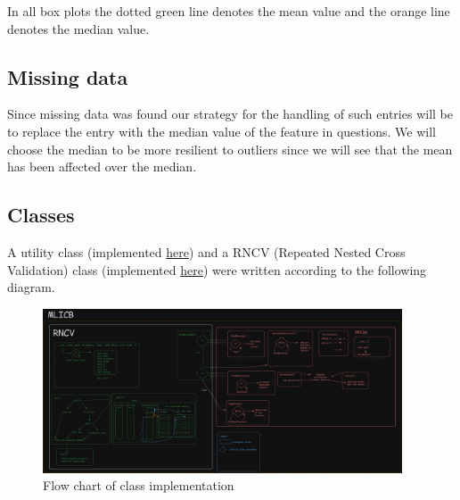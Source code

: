 \documentclass[12pt, a4paper]{article}
\begin{document}
\begin{multicols}{2}
    In all box plots the dotted green line denotes the mean value and the orange line denotes the median value.
    \newline

    \subsection{Missing data} \label{subsec:missing}

    Since missing data was found our strategy for the handling of such entries will be to replace the entry with the median value of the feature in questions. We will choose the median to be more resilient to outliers since we will see that the mean has been affected over the median.
    \newline

    \subsection{Classes} \label{subsec:class}

    A utility class (implemented \href{https://github.com/ArisPodotas/Assignment-2-MLICB/blob/master/src/utils.py}{here}) and a RNCV (Repeated Nested Cross Validation) class (implemented \href{https://github.com/ArisPodotas/Assignment-2-MLICB/blob/master/src/classes.py}{here}) were written according to the following diagram.
    \newline

\end{multicols}

    \begin{figure}[H]
        \begin{center}
            \includegraphics[width=0.95\textwidth]{figures/rcv.png}
        \end{center}
        \caption{Flow chart of class implementation}\label{fig:class outline}
    \end{figure}
\end{document}

